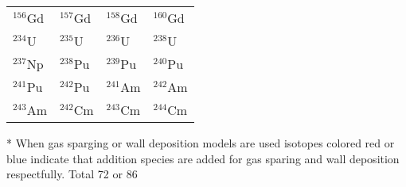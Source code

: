 \begin{table}[htbp]
\begin{threeparttable}
\begin{tabular}{C{3cm}C{3cm}C{3cm}C{3cm}}
    ${}^{156}$Gd & ${}^{157}$Gd & ${}^{158}$Gd & ${}^{160}$Gd \\
    ${}^{234}$U & ${}^{235}$U & ${}^{236}$U & ${}^{238}$U \\  
    ${}^{237}$Np & ${}^{238}$Pu & ${}^{239}$Pu & ${}^{240}$Pu \\
    ${}^{241}$Pu & ${}^{242}$Pu & ${}^{241}$Am & ${}^{242}$Am \\
    ${}^{243}$Am & ${}^{242}$Cm & ${}^{243}$Cm & ${}^{244}$Cm \\
    \hline
    \end{tabular}
    \begin{tablenotes}\footnotesize
    \item[*] When gas sparging or wall deposition models are used isotopes colored red or blue indicate that addition species are added for gas sparing and wall deposition respectfully. Total 72 or 86 
    
   \end{tablenotes}
   \end{threeparttable}
\end{table}

